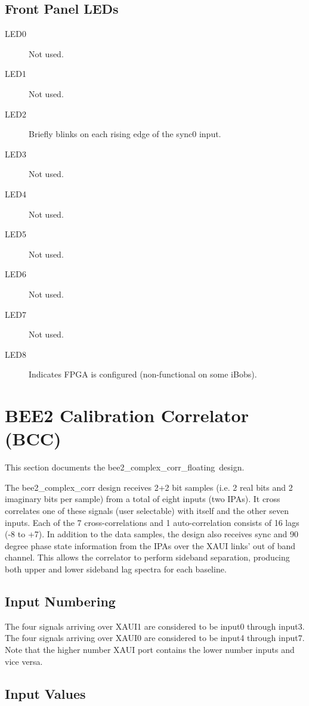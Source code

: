 \documentclass[12pt]{article}
\begin{document}
\filbreak
  \subsection{Front Panel LEDs}
\begin{description}
\item[LED0] Not used.
\item[LED1] Not used.
\item[LED2] Briefly blinks on each rising edge of the sync0 input.
\item[LED3] Not used.
\item[LED4] Not used.
\item[LED5] Not used.
\item[LED6] Not used.
\item[LED7] Not used.
\item[LED8] Indicates FPGA is configured (non-functional on some iBobs).
\end{description}

\newpage
\section{BEE2 Calibration Correlator (BCC)}

This section documents the bee2\_complex\_corr\_floating\bccver\ design.

The bee2\_complex\_corr design receives 2+2 bit samples (i.e. 2 real bits and 2
imaginary bits per sample) from a total of eight inputs (two IPAs).  It cross
correlates one of these signals (user selectable) with itself and the other
seven inputs.  Each of the 7 cross-correlations and 1 auto-correlation consists
of 16 lags (-8 to +7).  In addition to the data samples, the design also
receives sync and 90 degree phase state information from the IPAs over the XAUI
links' out of band channel.  This allows the correlator to perform sideband
separation, producing both upper and lower sideband lag spectra for each
baseline.

\subsection{Input Numbering}

The four signals arriving over XAUI1 are considered to be input0 through
input3.  The four signals arriving over XAUI0 are considered to be input4
through input7.  Note that the higher number XAUI port contains the lower
number inputs and vice versa.

\subsection{Input Values}
\end{document}
